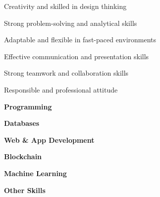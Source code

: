 



\begin{coloritemize}
    \item Creativity and skilled in design thinking
    \item Strong problem-solving and analytical skills
    \item Adaptable and flexible in fast-paced environments
    \item Effective communication and presentation skills
    \item Strong teamwork and collaboration skills
    \item Responsible and professional attitude
\end{coloritemize}

\begin{comment}
\cvtag{Creative}
\cvtag{Design Thinking}
\cvtag{Problem-solving}
\cvtag{Analytical}
\cvtag{Adaptable}
\cvtag{Flexible}
\cvtag{Presenting}
\cvtag{Collaboration}
\cvtag{Responsible}
\end{comment}




\textbf{Programming}
\medskip


\medskip
\textbf{Databases}
\medskip


\medskip
\textbf{Web \& App Development}
\medskip


\medskip
\textbf{Blockchain}
\medskip


\medskip
\textbf{Machine Learning}
\medskip


\medskip
\textbf{Other Skills}
\medskip

